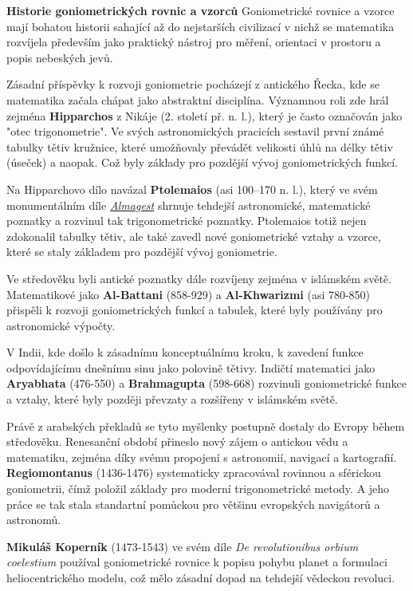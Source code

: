 \documentclass[12pt,a4paper]{article}
\begin{document}
\begin{historicalbox}
\textbf{Historie goniometrických rovnic a vzorců}
Goniometrické rovnice a vzorce mají bohatou historii sahající až do nejstarších civilizací
v nichž se matematika rozvíjela především jako praktický nástroj pro měření, orientaci v prostoru
a popis nebeských jevů.

Zásadní příspěvky k rozvoji goniometrie pocházejí z antického Řecka, kde se matematika
začala chápat jako abstraktní disciplína. Významnou roli zde hrál zejména
\textbf{Hipparchos} z Nikáje (2. století př. n. l.), který je často označován jako "otec trigonometrie".
Ve svých astronomických pracicích sestavil první známé tabulky tětiv kružnice,
které umožňovaly převádět velikosti úhlů na délky tětiv (úseček) a naopak.
Což byly základy pro pozdější vývoj goniometrických funkcí.

Na Hipparchovo dílo navázal \textbf{Ptolemaios} (asi 100–170 n. l.), 
který ve svém monumentálním díle
\href{https://classicalliberalarts.com/resources/PTOLEMY_ALMAGEST_ENGLISH.pdf}{\textit{Almagest}}
shrnuje tehdejší astronomické, matematické poznatky a rozvinul tak trigonometrické poznatky.
Ptolemaios totiž nejen zdokonalil tabulky tětiv, ale také zavedl nové goniometrické vztahy
a vzorce, které se staly základem pro pozdější vývoj goniometrie.

Ve středověku byli antické poznatky dále rozvíjeny zejména v islámském světě.
Matematikové jako \textbf{Al-Battani} (858-929) a \textbf{Al-Khwarizmi} (asi 780-850)
přispěli k rozvoji goniometrických funkcí a tabulek, které byly používány pro astronomické výpočty.

V Indii, kde došlo k zásadnímu konceptuálnímu kroku, k zavedení funkce odpovídajícímu dnešnímu
sinu jako polovině tětivy. Indičtí matematici jako \textbf{Aryabhata} (476-550) a \textbf{Brahmagupta} (598-668)
rozvinuli goniometrické funkce a vztahy, které byly později převzaty a rozšířeny v islámském světě.

Právě z arabských překladů se tyto myšlenky postupně dostaly do Evropy během středověku.
Renesanční období přineslo nový zájem o antickou vědu a matematiku, zejména díky svému propojení 
s astronomií, navigací a kartografií. \textbf{Regiomontanus} (1436-1476) systematicky
zpracovával rovinnou a sférickou goniometrii, čímž položil základy pro moderní trigonometrické metody.
A jeho práce se tak stala standartní pomůckou pro většinu evropských navigátorů a astronomů.

\textbf{Mikuláš Koperník} (1473-1543) ve svém díle \textit{De revolutionibus orbium coelestium}
používal goniometrické rovnice k popisu pohybu planet a formulaci heliocentrického modelu, 
což mělo zásadní dopad na tehdejší vědeckou revoluci.


\end{historicalbox}
\end{document}
